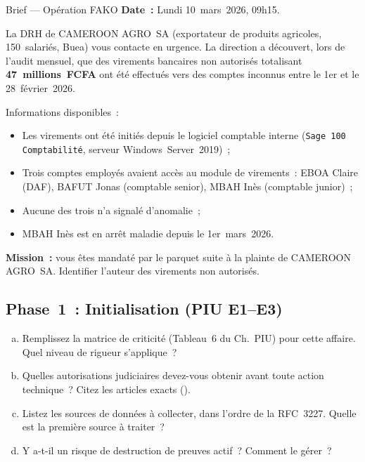 \begin{boxscenario}{Brief --- Opération FAKO}
\textbf{Date~:} Lundi 10~mars~2026, 09h15.

La DRH de CAMEROON AGRO~SA (exportateur de produits agricoles,
150~salariés, Buea) vous contacte en urgence. La direction a
découvert, lors de l'audit mensuel, que des virements bancaires
non autorisés totalisant \textbf{47~millions~FCFA} ont été effectués
vers des comptes inconnus entre le 1er et le 28~février~2026.

Informations disponibles~:
\begin{itemize}
    \item Les virements ont été initiés depuis le logiciel comptable
          interne (\texttt{Sage~100 Comptabilité}, serveur Windows~Server~2019)~;
    \item Trois comptes employés avaient accès au module de virements~:
          EBOA Claire (DAF), BAFUT Jonas (comptable senior),
          MBAH Inès (comptable junior)~;
    \item Aucune des trois n'a signalé d'anomalie~;
    \item MBAH Inès est en arrêt maladie depuis le 1er~mars~2026.
\end{itemize}

\textbf{Mission~:} vous êtes mandaté par le parquet suite à la plainte
de CAMEROON AGRO~SA. Identifier l'auteur des virements non autorisés.
\end{boxscenario}

\subsection{Phase~1~: Initialisation (PIU E1--E3)}

\begin{boxexo}[title={\ding{45}\quad FAKO --- Étape~1~: Cadrage}]
\begin{enumerate}[(a)]
    \item Remplissez la matrice de criticité (Tableau~6 du Ch.~PIU)
          pour cette affaire. Quel niveau de rigueur s'applique~?
    \item Quelles autorisations judiciaires devez-vous obtenir
          avant toute action technique~? Citez les articles exacts
          ().
    \item Listez les sources de données à collecter, dans l'ordre
          de la RFC~3227. Quelle est la première source à traiter~?
    \item Y a-t-il un risque de destruction de preuves actif~?
          Comment le gérer~?
\end{enumerate}
\end{boxexo}

